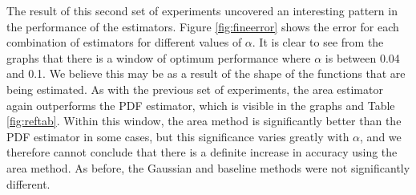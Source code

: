 \documentclass[a4paper,11pt]{article}
\begin{document}
    The result of this second set of experiments uncovered an interesting
    pattern in the performance of the estimators. Figure \ref{fig:fineerror}
    shows the error for each combination of estimators for different values of
    $\alpha$. It is clear to see from the graphs that there is a window of
    optimum performance where $\alpha$ is between 0.04 and 0.1. We believe this
    may be as a result of the shape of the functions that are being
    estimated. As with the previous set of experiments, the area estimator again
    outperforms the PDF estimator, which is visible in the graphs and Table
    \ref{fig:reftab}. Within this window, the area method is significantly
    better than the PDF estimator in some cases, but this significance varies
    greatly with $\alpha$, and we therefore cannot conclude that there is a
    definite increase in accuracy using the area method. As before, the Gaussian
    and baseline methods were not significantly different.
\end{document}
